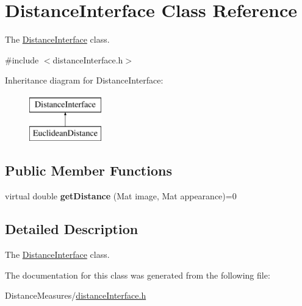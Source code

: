 \hypertarget{class_distance_interface}{}\section{Distance\+Interface Class Reference}
\label{class_distance_interface}


The \hyperlink{class_distance_interface}{Distance\+Interface} class.  




{\ttfamily \#include $<$distance\+Interface.\+h$>$}

Inheritance diagram for Distance\+Interface\+:\begin{figure}[H]
\begin{center}
\leavevmode
\includegraphics[height=2.000000cm]{class_distance_interface}
\end{center}
\end{figure}
\subsection*{Public Member Functions}
\begin{DoxyCompactItemize}
\item 
\hypertarget{class_distance_interface_a0d5a9918ea1551571330bf2177d415f1}{}virtual double {\bfseries get\+Distance} (Mat image, Mat appearance)=0\label{class_distance_interface_a0d5a9918ea1551571330bf2177d415f1}

\end{DoxyCompactItemize}


\subsection{Detailed Description}
The \hyperlink{class_distance_interface}{Distance\+Interface} class. 

The documentation for this class was generated from the following file\+:\begin{DoxyCompactItemize}
\item 
Distance\+Measures/\hyperlink{distance_interface_8h}{distance\+Interface.\+h}\end{DoxyCompactItemize}
